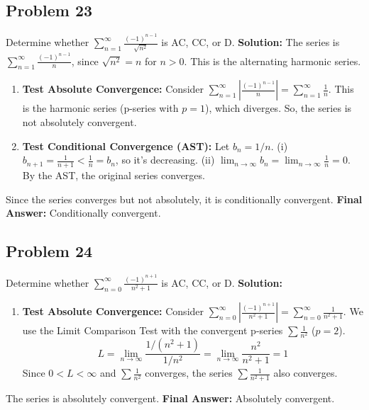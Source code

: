 \documentclass{article}
\begin{document}
\subsection*{Problem 23}
Determine whether $\sum_{n=1}^{\infty} \frac{(-1)^{n-1}}{\sqrt{n^2}}$ is AC, CC, or D.
\textbf{Solution:} The series is $\sum_{n=1}^{\infty} \frac{(-1)^{n-1}}{n}$, since $\sqrt{n^2}=n$ for $n>0$. This is the alternating harmonic series.
\begin{enumerate}
    \item \textbf{Test Absolute Convergence:} Consider $\sum_{n=1}^{\infty} \left| \frac{(-1)^{n-1}}{n} \right| = \sum_{n=1}^{\infty} \frac{1}{n}$. This is the harmonic series (p-series with $p=1$), which diverges. So, the series is not absolutely convergent.
    \item \textbf{Test Conditional Convergence (AST):} Let $b_n = 1/n$.
    (i) $b_{n+1} = \frac{1}{n+1} < \frac{1}{n} = b_n$, so it's decreasing.
    (ii) $\lim_{n \to \infty} b_n = \lim_{n \to \infty} \frac{1}{n} = 0$.
    By the AST, the original series converges.
\end{enumerate}
Since the series converges but not absolutely, it is conditionally convergent.
\textbf{Final Answer:} Conditionally convergent.

\subsection*{Problem 24}
Determine whether $\sum_{n=0}^{\infty} \frac{(-1)^{n+1}}{n^2+1}$ is AC, CC, or D.
\textbf{Solution:}
\begin{enumerate}
    \item \textbf{Test Absolute Convergence:} Consider $\sum_{n=0}^{\infty} \left| \frac{(-1)^{n+1}}{n^2+1} \right| = \sum_{n=0}^{\infty} \frac{1}{n^2+1}$. We use the Limit Comparison Test with the convergent p-series $\sum \frac{1}{n^2}$ ($p=2$).
    \[ L = \lim_{n \to \infty} \frac{1/(n^2+1)}{1/n^2} = \lim_{n \to \infty} \frac{n^2}{n^2+1} = 1 \]
    Since $0 < L < \infty$ and $\sum \frac{1}{n^2}$ converges, the series $\sum \frac{1}{n^2+1}$ also converges.
\end{enumerate}
The series is absolutely convergent.
\textbf{Final Answer:} Absolutely convergent.
\end{document}
